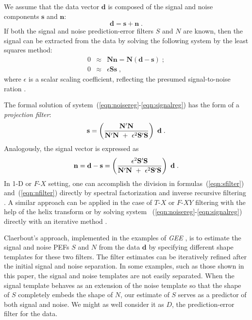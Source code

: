We assume that the data vector $\mathbf{d}$ is composed of the signal
and noise components $\mathbf{s}$ and $\mathbf{n}$:
\begin{equation}
  \label{spn}
  \mathbf{d = s + n}\;.
\end{equation}
If both the signal and noise prediction-error filters $S$ and
$N$ are known, then the signal can be extracted from the data
by solving the following system by the least squares method:
\begin{eqnarray}
\label{eqn:noisereg}
0 & \approx &          \mathbf N \mathbf n = \mathbf N ( \mathbf d - \mathbf s)\;;  \\
\label{eqn:signalreg}
0 & \approx & \epsilon \mathbf S \mathbf s\;,
\end{eqnarray} 
where $\epsilon$ is a scalar scaling coefficient, reflecting the
presumed signal-to-noise ration \cite[]{gee}. 
\par
The formal solution of system~(\ref{eqn:noisereg}-\ref{eqn:signalreg})
has the form of a \emph{projection filter}:
\begin{equation}
  \label{eqn:sfilter}
  \mathbf s =
  \left(
    \mathbf N' \mathbf N
    \over
    \mathbf N' \mathbf N \ + \ \epsilon^2 \mathbf S'\mathbf S 
  \right) \ \mathbf d\;.
\end{equation}
Analogously, the signal vector is expressed as
\begin{equation}
  \label{eqn:nfilter}
  \mathbf n = \mathbf d - \mathbf s =
  \left(
    \epsilon^2 \mathbf S' \mathbf S
    \over
    \mathbf N' \mathbf N \ + \ \epsilon^2 \mathbf S'\mathbf S 
  \right) \ \mathbf d\;.
\end{equation}
In 1-D or $F$-$X$ setting, one can accomplish the division in
formulas~(\ref{eqn:sfilter}) and~(\ref{eqn:nfilter}) directly by
spectral factorization and inverse recursive filtering
\cite[]{SEG-1995-0711,SEG-1994-1576}. A similar approach can be applied
in the case of $T$-$X$ or $F$-$XY$ filtering with the help of the
helix transform \cite[]{GEO63-05-15321541,SEG-1999-12311234} or by
solving system ~(\ref{eqn:noisereg}-\ref{eqn:signalreg}) directly with
an iterative method \cite[]{Abma.sepphd.88}.
\par
Claerbout's approach, implemented in the examples of \emph{GEE}
\cite[]{gee}, is to estimate the signal and noise PEFs $S$ and $N$ from
the data $\mathbf{d}$ by specifying different shape templates for these
two filters. The filter estimates can be iteratively refined after the
initial signal and noise separation.  In some examples, such as those
shown in this paper, the signal and noise templates are not easily
separated. When the signal template behaves as an extension of the
noise template so that the shape of $S$ completely embeds the shape of
$N$, our estimate of $S$ serves as a predictor of both signal and
noise. We might as well consider it as $D$, the prediction-error
filter for the data.

